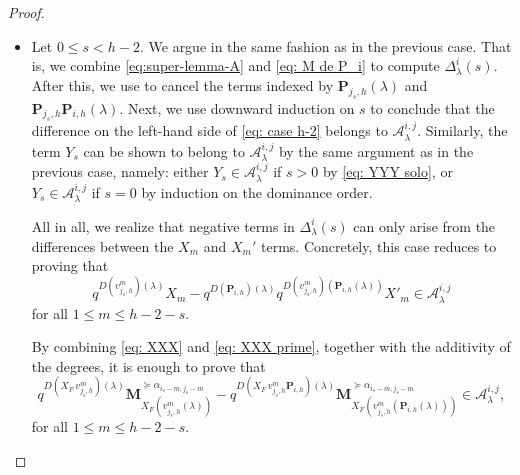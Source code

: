 \begin{proof}
\begin{itemize}
On the one hand, we have
\begin{equation} \label{eq: case h-2}
   \bfM_{\lambda}^{\succeq \alpha_{i_s,j_s}} - q^{D(\mathbf{P}_{i,h})(\lambda)} \bfM_{\mathbf{P}_{i,h}(\lambda)}^{\succeq \alpha_{i_s,j_s}} = \Delta_{\lambda}^i(s+1).  
\end{equation}
The right-hand side of \eqref{eq: case h-2} belongs to $\mathcal{A}_{\lambda}^{i,j}$ by the case $s=h-1$ treated above. 

On the other hand, if $h>2$, then $i_s<i=h$, so we can conclude that $Y_s\in \mathcal{A}_{\lambda}^{i,j}$ by arguing as in the previous case. 
If $h=2$, then $s=0$, so that $Y_s= \Delta_{\mathbf{v}_{j,h}(\lambda)}^i(s)$. 
Since $\mathbf{v}_{j,h}(\lambda) <\lambda$, we can argue by induction on the dominance order to conclude that $Y_s\in \mathcal{A}_{\lambda}^{i,j}$. 


\smallskip
 \item Let $0\leq s < h-2$.
 We argue in the same fashion as in the previous case. 
That is, we combine \eqref{eq:super-lemma-A}
 and \eqref{eq: M de P_i} to compute $\Delta_{\lambda}^i(s)$. 
 After this, we use  to cancel the terms indexed by $ \mathbf{P}_{j_s,h}(\lambda) $ and $\mathbf{P}_{j_s,h}\mathbf{P}_{i,h}(\lambda)$. 
 Next, we use downward induction on $s$ to conclude that the difference on the left-hand side of \eqref{eq: case h-2} belongs to $\mathcal{A}_{\lambda}^{i,j}$. 
 Similarly, the term $Y_s$ can be shown to belong to $\mathcal{A}_{\lambda}^{i,j}$ by the same argument as in the previous case, namely: either $Y_s \in \mathcal{A}_{\lambda}^{i,j}$ if $s>0$ by \eqref{eq: YYY solo}, or $Y_s \in \mathcal{A}_{\lambda}^{i,j}$ if $s=0$ by induction on the dominance order. 
 
 All in all, we realize that negative terms in $\Delta_{\lambda}^i(s)$ can only arise from the differences between the $X_m$ and $X_m'$ terms. 
 Concretely, this case reduces to proving that 
\begin{equation}
   q^{D(v_{j_s,h}^m)(\lambda)}  X_m  - q^{D(\mathbf{P}_{i,h})(\lambda)} q^{D(v_{j_s,h}^m)(\mathbf{P}_{i,h}(\lambda))}X'_m \in \mathcal{A}_{\lambda}^{i,j}
\end{equation}
for all $1\leq m \leq h-2-s$. 

By combining \eqref{eq: XXX} and \eqref{eq: XXX prime}, together with the additivity of the degrees, it is enough to prove that  
\begin{equation} \label{eq: it is enough A}
   q^{D(X_F\, v_{j_s,h}^m)(\lambda)}  \mathbf{M}_{X_F(v_{j_s,h}^m(\lambda))}^{\succeq \alpha_{i_s-m,j_s-m}}  - q^{D(X_F\, v_{j_s,h}^m \mathbf{P}_{i,h})(\lambda)} \mathbf{M}_{X_F(v_{j_s,h}^m(\mathbf{P}_{i,h}(\lambda)))}^{\succeq \alpha_{i_s-m,j_s-m}}\in \mathcal{A}_{\lambda}^{i,j},
\end{equation}
for all $1\leq m \leq h-2-s$. 


\end{itemize}
\end{proof}
